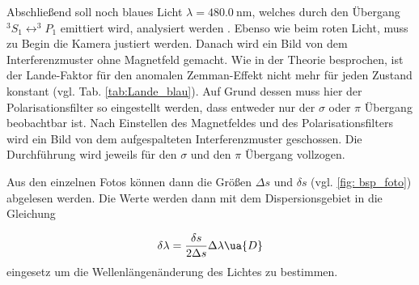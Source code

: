 Abschließend soll noch blaues Licht $\lambda=\SI{480.0}{\nm}$, welches durch den Übergang $^3S_1\leftrightarrow ^3\!\!P_1$ emittiert wird,
analysiert werden \cite{anleitung27}. Ebenso wie beim roten Licht, muss zu Begin die Kamera justiert werden. %
Danach wird ein Bild von dem Interferenzmuster ohne Magnetfeld gemacht. Wie in der Theorie besprochen, ist der
Lande-Faktor für den anomalen Zemman-Effekt nicht mehr für jeden Zustand konstant (vgl. Tab. \ref{tab:Lande_blau}). Auf Grund dessen muss hier der Polarisationsfilter %
so eingestellt werden, dass entweder nur der $\sigma$ oder $\pi$ Übergang beobachtbar ist. Nach Einstellen des Magnetfeldes
und des Polarisationsfilters wird ein Bild von dem aufgespalteten Interferenzmuster geschossen. Die Durchführung wird jeweils %
 für den $\sigma$ und den $\pi$ Übergang vollzogen.

Aus den einzelnen Fotos können dann die Größen $\Delta s$ und $\delta s$ (vgl. \ref{fig: bsp_foto}) abgelesen werden.
Die Werte werden dann mit dem Dispersionsgebiet in die Gleichung

\begin{equation}
  \label{eq: wellen_änderung}
  \delta \lambda=\frac{\delta s}{2\Delta s} \Delta \lambda\ua{D}
\end{equation}
eingesetz um die Wellenlängenänderung des Lichtes zu bestimmen.
